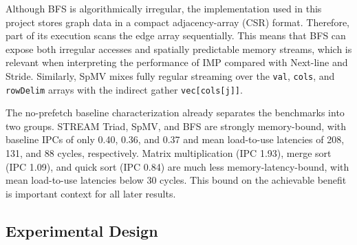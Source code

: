 \documentclass[12pt, letterpaper]{article}
\begin{document}
\begin{table}[tbp]
\caption{Benchmark selection and problem sizes.}
\centering
{}
\label{tab:bench}
\end{table}

\noindent Although BFS is algorithmically irregular, the implementation used in this project stores graph data in a compact adjacency-array (CSR) format. Therefore, part of its execution scans the edge array sequentially. This means that BFS can expose both irregular accesses and spatially predictable memory streams, which is relevant when interpreting the performance of IMP compared with Next-line and Stride. Similarly, SpMV mixes fully regular streaming over the \texttt{val}, \texttt{cols}, and \texttt{rowDelim} arrays with the indirect gather \texttt{vec[cols[j]]}.

\noindent The no-prefetch baseline characterization already separates the benchmarks into two groups. STREAM Triad, SpMV, and BFS are strongly memory-bound, with baseline IPCs of only 0.40, 0.36, and 0.37 and mean load-to-use latencies of 208, 131, and 88 cycles, respectively. Matrix multiplication (IPC 1.93), merge sort (IPC 1.09), and quick sort (IPC 0.84) are much less memory-latency-bound, with mean load-to-use latencies below 30 cycles. This bound on the achievable benefit is important context for all later results.

\subsection{Experimental Design}
\label{sec:eval:design}
\end{document}
